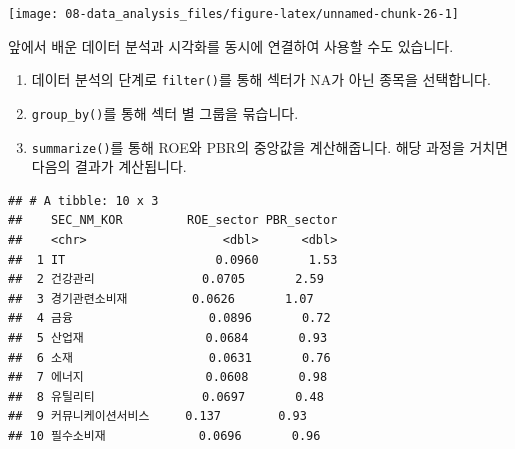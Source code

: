 \documentclass[12pt,]{book}
\newenvironment{Shaded}{\begin{snugshade}}{\end{snugshade}}
\newcommand{\DataTypeTok}[1]{\textcolor[rgb]{0.13,0.29,0.53}{#1}}
\newcommand{\DecValTok}[1]{\textcolor[rgb]{0.00,0.00,0.81}{#1}}
\newcommand{\FloatTok}[1]{\textcolor[rgb]{0.00,0.00,0.81}{#1}}
\newcommand{\KeywordTok}[1]{\textcolor[rgb]{0.13,0.29,0.53}{\textbf{#1}}}
\newcommand{\NormalTok}[1]{#1}
\newcommand{\OperatorTok}[1]{\textcolor[rgb]{0.81,0.36,0.00}{\textbf{#1}}}
\newcommand{\OtherTok}[1]{\textcolor[rgb]{0.56,0.35,0.01}{#1}}
\newcommand{\StringTok}[1]{\textcolor[rgb]{0.31,0.60,0.02}{#1}}
\providecommand{\tightlist}{%
  \setlength{\itemsep}{0pt}\setlength{\parskip}{0pt}}
\begin{document}
\begin{Shaded}
\end{Shaded}

\begin{center}\texttt{[image: 08-data\_analysis\_files/figure-latex/unnamed-chunk-26-1]} \end{center}

앞에서 배운 데이터 분석과 시각화를 동시에 연결하여 사용할 수도 있습니다.

\begin{enumerate}
\def\labelenumi{\arabic{enumi}.}
\tightlist
\item
  데이터 분석의 단계로 \texttt{filter()}를 통해 섹터가 NA가 아닌 종목을 선택합니다.
\item
  \texttt{group\_by()}를 통해 섹터 별 그룹을 묶습니다.
\item
  \texttt{summarize()}를 통해 ROE와 PBR의 중앙값을 계산해줍니다. 해당 과정을 거치면 다음의 결과가 계산됩니다.
\end{enumerate}

\begin{verbatim}
## # A tibble: 10 x 3
##    SEC_NM_KOR         ROE_sector PBR_sector
##    <chr>                   <dbl>      <dbl>
##  1 IT                     0.0960       1.53
##  2 건강관리               0.0705       2.59
##  3 경기관련소비재         0.0626       1.07
##  4 금융                   0.0896       0.72
##  5 산업재                 0.0684       0.93
##  6 소재                   0.0631       0.76
##  7 에너지                 0.0608       0.98
##  8 유틸리티               0.0697       0.48
##  9 커뮤니케이션서비스     0.137        0.93
## 10 필수소비재             0.0696       0.96
\end{verbatim}
\end{document}
